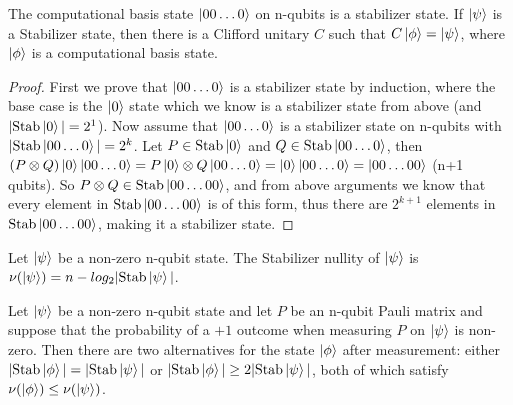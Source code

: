\documentclass[12pt]{dalthesis}
\begin{document}
\begin{corollary}
The computational basis state $\ket{00 \dots 0}$ on n-qubits is a stabilizer state. If $\ket{\psi}$ is a Stabilizer state, then there is a Clifford unitary $C$ such that $C\ket{\phi} = \ket{\psi}$, where $\ket{\phi}$ is a computational basis state.
\end{corollary}
\begin{proof}
First we prove that $\ket{00 \dots 0}$ is a stabilizer state by induction, where the base case is the $\ket{0}$ state which we know is a stabilizer state from above (and $|\text{Stab}\ket{0}| = 2^1$). Now assume that $\ket{00 \dots 0}$ is a stabilizer state on n-qubits with $|\text{Stab}\ket{00 \dots 0}| = 2^k$. Let $P \in \text{Stab}\ket{0}$ and $Q \in \text{Stab}\ket{00 \dots 0}$, then $(P \otimes Q)\ket{0}\ket{00 \dots 0} = P\ket{0} \otimes Q\ket{00 \dots 0} = \ket{0}\ket{00 \dots 0} = \ket{00 \dots 00}$ (n+1 qubits). So $P \otimes Q \in \text{Stab}\ket{00 \dots 00}$, and from above arguments we know that every element in $\text{Stab}\ket{00 \dots 00}$ is of this form, thus there are $2^{k+1}$ elements in $\text{Stab}\ket{00 \dots 00}$, making it a stabilizer state.
\end{proof}

\begin{definition}
Let $\ket{\psi}$ be a non-zero n-qubit state. The Stabilizer nullity of $\ket{\psi}$ is $\nu(\ket{\psi}) = n - log_2 |\text{Stab}\ket{\psi}|$.
\end{definition}

\begin{proposition}
Let $\ket{\psi}$ be a non-zero n-qubit state and let $P$ be an n-qubit Pauli matrix and suppose that the probability of a $+1$ outcome when measuring $P$ on $\ket{\psi}$ is non-zero. Then there are two alternatives for the state $\ket{\phi}$ after measurement: either $|\text{Stab}\ket{\phi}| = |\text{Stab}\ket{\psi}|$ or $|\text{Stab}\ket{\phi}| \geq 2|\text{Stab}\ket{\psi}|$, both of which satisfy $\nu(\ket{\phi}) \leq \nu(\ket{\psi})$.
\end{proposition}
\end{document}
